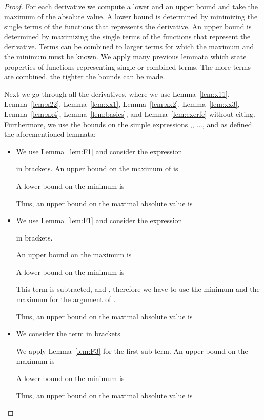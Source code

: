 \documentclass{article}
\begin{document}
\begin{proof}
For each derivative we compute a lower and an upper bound and take the
maximum of the absolute value. 
A lower bound is determined by minimizing the single terms of the
functions that represents the derivative. An upper bound is determined
by maximizing the single terms of the functions that represent the
derivative. Terms can be combined to larger terms for which
the maximum and the minimum must be known. We apply many previous lemmata
which state properties of functions representing single or combined
terms. The more terms are combined, the tighter the bounds can be
made. 

Next we go through all the derivatives, where we use 
Lemma~\ref{lem:x11}, 
Lemma~\ref{lem:x22}, 
Lemma~\ref{lem:xx1}, 
Lemma~\ref{lem:xx2}, 
Lemma~\ref{lem:xx3},
Lemma~\ref{lem:xx4},
Lemma~\ref{lem:basics}, and
Lemma~\ref{lem:exerfc} without citing. Furthermore, we use the bounds on the simple
expressions ,, ..., and  as defined the aforementioned lemmata:
\begin{itemize}
\item 

We use Lemma~\ref{lem:F1} and
consider the expression 

in brackets.
An upper bound on the maximum of is

A lower bound on the minimum is

Thus, an upper bound on the maximal absolute value is 


\item 

We use Lemma~\ref{lem:F1} and
consider the expression 

in brackets.

An upper bound on the maximum is

A lower bound on the minimum is

This term is subtracted, and , therefore we have
to use the minimum and the maximum for the argument of .

Thus, an upper bound on the maximal absolute value is 


\item 

We consider the term in brackets


We apply Lemma~\ref{lem:F3} for the first sub-term.
An upper bound on the maximum is

A lower bound on the minimum is


Thus, an upper bound on the maximal absolute value is 



\end{itemize}
\end{proof}
\end{document}
